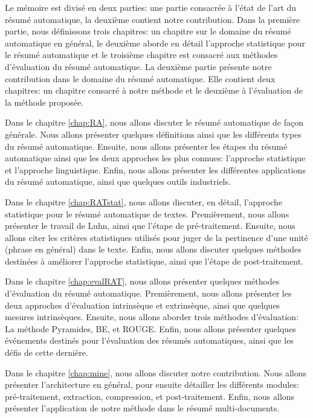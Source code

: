 \documentclass[a4paper,12pt,oneside]{../use/ESIthesis}
\begin{document}
Le mémoire est divisé en deux parties: une partie consacrée à l'état de l'art du résumé automatique, la deuxième contient notre contribution. 
Dans la première partie, nous définissons trois chapitres: un chapitre sur le domaine du résumé automatique en général, le deuxième aborde en détail l'approche statistique pour le résumé automatique et le troisième chapitre est consacré aux méthodes d'évaluation du résumé automatique.
La deuxième partie présente notre contribution dans le domaine du résumé automatique.
Elle contient deux chapitres: un chapitre consacré à notre méthode et le deuxième à l'évaluation de la méthode proposée.

Dans le chapitre \ref{chap:RA}, nous allons discuter le résumé automatique de façon générale.
Nous allons présenter quelques définitions ainsi que les différents types du résumé automatique. 
Ensuite, nous allons présenter les étapes du résumé automatique ainsi que les deux approches les plus connues: l'approche statistique et l'approche linguistique. 
Enfin, nous allons présenter les différentes applications du résumé automatique, ainsi que quelques outils industriels.

Dans le chapitre \ref{chap:RATstat}, nous allons discuter, en détail, l'approche statistique pour le résumé automatique de textes.
Premièrement, nous allons présenter le travail de Luhn, ainsi que l'étape de pré-traitement. 
Ensuite, nous allons citer les critères statistiques utilisés pour juger de la pertinence d'une unité (phrase en général) dans le texte. 
Enfin, nous allons discuter quelques méthodes destinées à améliorer l'approche statistique, ainsi que l'étape de post-traitement.

Dans le chapitre \ref{chap:evalRAT}, nous allons présenter quelques méthodes d'évaluation du résumé automatique. 
Premièrement, nous allons présenter les deux approches d'évaluation intrinsèque et extrinsèque, ainsi que quelques mesures intrinsèques.
Ensuite, nous allons aborder trois méthodes d'évaluation: La méthode Pyramides, BE, et ROUGE. 
Enfin, nous allons présenter quelques événements destinés pour l'évaluation des résumés automatiques, ainsi que les défis de cette dernière.

Dans le chapitre \ref{chap:mine}, nous allons discuter notre contribution.
Nous allons présenter l'architecture en général, pour ensuite détailler les différents modules: pré-traitement, extraction, compression, et post-traitement. 
Enfin, nous allons présenter l'application de notre méthode dans le résumé multi-documents. 
\end{document}
